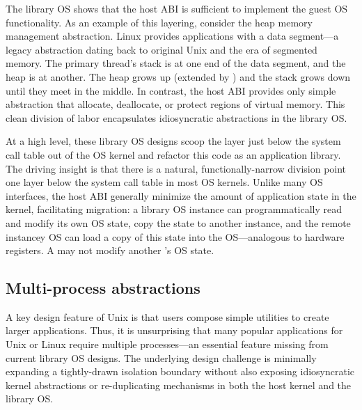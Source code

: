 The library OS shows that the host ABI is sufficient to implement the guest OS functionality.
As an example of this layering, consider the heap memory management abstraction. Linux provides applications with a data segment---a legacy abstraction dating back to original Unix and the era of segmented memory. The primary thread's stack is at one end of the data segment, and the heap is at another.  The heap grows up (extended by ) and the stack grows down until they meet in the middle.
In contrast, the host ABI provides only simple abstraction that allocate, deallocate, or protect regions of virtual memory.
This clean division of labor encapsulates idiosyncratic abstractions
in the library OS.



At a high level, these library OS designs
scoop the layer just below the system call table out of the OS kernel
and refactor this code as an application library.  
The driving insight is that there is a natural, functionally-narrow division point 
one layer below the system call table
in most OS kernels.
Unlike many OS interfaces, the host ABI generally minimize the amount of application state in the kernel, facilitating
migration: a library OS instance can programmatically read and modify its own OS state, copy the state to another instance, and the remote instancey OS can 
load a copy of this state into the OS---analogous to hardware registers.
A \picoproc{} may not modify another \picoproc{}'s OS state.



\subsection{Multi-process abstractions}
\label{sec:overview:libos:multiproc}


A key design feature of Unix is that users compose simple utilities to create larger applications.  Thus, it is unsurprising that many popular applications for Unix or Linux require multiple processes---an essential feature missing from current library OS designs.
The underlying design challenge is minimally expanding a tightly-drawn isolation boundary without also exposing idiosyncratic kernel abstractions or re-duplicating mechanisms in both the host kernel and the library OS.

